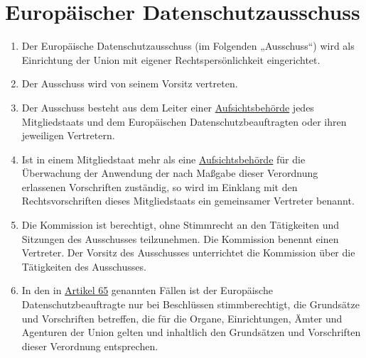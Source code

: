 \chapter{Europäischer Datenschutzausschuss}
\label{ch:68}


\begin{enumerate}

  \item Der Europäische Datenschutzausschuss (im Folgenden „Ausschuss“) wird als Einrichtung der Union mit eigener
   Rechtspersönlichkeit eingerichtet.
  \label{itm:68-1}

  \item Der Ausschuss wird von seinem Vorsitz vertreten.
  \label{itm:68-2}

  \item Der Ausschuss besteht aus dem Leiter einer \hyperref[itm:04-21]{Aufsichtsbehörde} jedes Mitgliedstaats und dem Europäischen
   Datenschutzbeauftragten oder ihren jeweiligen Vertretern.
  \label{itm:68-3}

  \item Ist in einem Mitgliedstaat mehr als eine \hyperref[itm:04-21]{Aufsichtsbehörde} für die Überwachung der Anwendung der nach Maßgabe
   dieser Verordnung erlassenen Vorschriften zuständig, so wird im Einklang mit den Rechtsvorschriften dieses
   Mitgliedstaats ein gemeinsamer Vertreter benannt.
  \label{itm:68-4}

  \item Die Kommission ist berechtigt, ohne Stimmrecht an den Tätigkeiten und Sitzungen des Ausschusses teilzunehmen.
   Die Kommission benennt einen Vertreter. Der Vorsitz des Ausschusses unterrichtet die Kommission über die Tätigkeiten
   des Ausschusses.
  \label{itm:68-5}

  \item In den in \hyperref[ch:65]{Artikel 65} genannten Fällen ist der Europäische Datenschutzbeauftragte nur bei
   Beschlüssen stimmberechtigt, die Grundsätze und Vorschriften betreffen, die für die Organe, Einrichtungen, Ämter und
   Agenturen der Union gelten und inhaltlich den Grundsätzen und Vorschriften dieser Verordnung entsprechen.
  \label{itm:68-6}

\end{enumerate}


